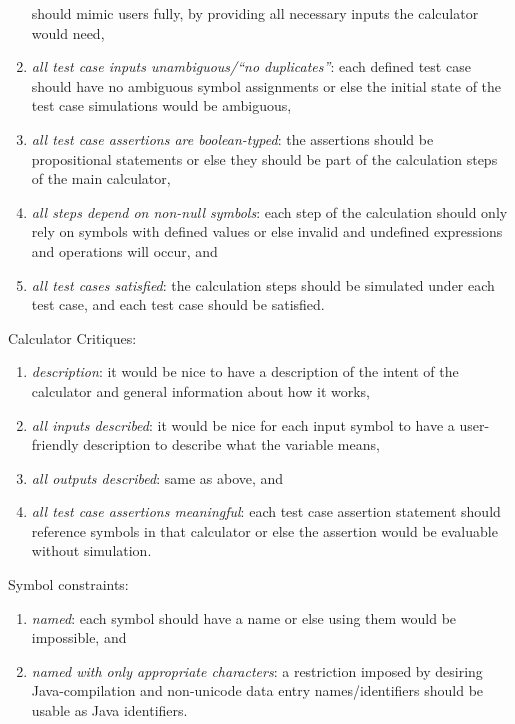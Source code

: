 \documentclass[11pt,fleqn]{article}
\begin{document}
\begin{enumerate}
        should mimic users fully, by providing all necessary inputs the
        calculator would need,
  \item \textit{all test case inputs unambiguous/``no duplicates''}: each
        defined test case should have no ambiguous symbol assignments or else
        the initial state of the test case simulations would be ambiguous,
  \item \textit{all test case assertions are boolean-typed}: the assertions
        should be propositional statements or else they should be part of the
        calculation steps of the main calculator,
  \item \textit{all steps depend on non-null symbols}: each step of the
        calculation should only rely on symbols with defined values or else
        invalid and undefined expressions and operations will occur, and
  \item \textit{all test cases satisfied}: the calculation steps should be
        simulated under each test case, and each test case should be satisfied.
\end{enumerate}

\noindent{}Calculator Critiques:
\begin{enumerate}
  \item \textit{description}: it would be nice to have a description of the
        intent of the calculator and general information about how it works,
  \item \textit{all inputs described}: it would be nice for each input symbol to
        have a user-friendly description to describe what the variable means,
  \item \textit{all outputs described}: same as above, and
  \item \textit{all test case assertions meaningful}: each test case assertion
        statement should reference symbols in that calculator or else the
        assertion would be evaluable without simulation.
\end{enumerate}

\noindent{}Symbol constraints:
\begin{enumerate}
  \item \textit{named}: each symbol should have a name or else using them would
        be impossible, and
  \item \textit{named with only appropriate characters}: a restriction imposed
        by desiring Java-compilation and non-unicode data entry \textemdash{}
        names/identifiers should be usable as Java identifiers.
\end{enumerate}
\end{document}
